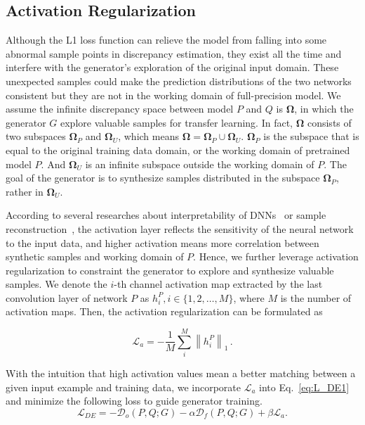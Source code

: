 \documentclass[final]{cvpr}
\begin{document}
\subsection{Activation Regularization}

Although the L1 loss function can relieve the model from falling into some abnormal sample points in discrepancy estimation, they exist all the time and interfere with the generator's exploration of the original input domain. These unexpected samples could make the prediction distributions of the two networks consistent but they are not in the working domain of full-precision model. 
We assume the infinite discrepancy space between model $P$ and $Q$ is $\mathbf{\Omega}$, in which the generator $G$ explore valuable samples for transfer learning. In fact, $\mathbf{\Omega}$ consists of two subspaces $\mathbf{\Omega}_P$ and $\mathbf{\Omega}_U$, which means $\mathbf{\Omega} = \mathbf{\Omega}_P \cup \mathbf{\Omega}_U$. $\mathbf{\Omega}_P$ is the subspace that is equal to the original training data domain, or the working domain of pretrained model $P$. And $\mathbf{\Omega}_U$ is an infinite subspace outside the working domain of $P$. 
The goal of the generator is to synthesize samples distributed in the subspace $\mathbf{\Omega}_P$, rather in $\mathbf{\Omega}_U$. 

According to several researches about interpretability of DNNs~\cite{zeiler2014visualizing,dong2017towards} or sample reconstruction~\cite{lopes2017data,chen2019data}, the activation layer reflects the sensitivity of the neural network to the input data, and higher activation means more correlation between synthetic samples and working domain of $P$. 
Hence, we further leverage activation regularization to constraint the generator to explore and synthesize valuable samples. We denote the $i$-th channel activation map extracted by the last convolution layer of network $P$ as $h^P_i, i\in \{1,2,\dots,M\}$, where $M$ is the number of activation maps. Then, the activation regularization can be formulated as 

\begin{equation}
  \label{eq:L_a}
  \mathcal{L}_{a} = -\frac{1}{M}\sum_{i}^{M}\left \| h^{P}_{i} \right \|_{1}\,.
\end{equation}

With the intuition that high activation values mean a better matching between a given input example and training data, we incorporate $\mathcal{L}_{a}$ into Eq.~\ref{eq:L_DE1} and minimize the following loss to guide generator training.
\begin{equation}
  \label{eq:L_DE}
  \mathcal{L}_{DE} = -\mathcal{D}_{o}(P, Q ; G) - \alpha\mathcal{D}_{f}(P, Q ; G) + \beta\mathcal{L}_{a}.
\end{equation}
\end{document}
